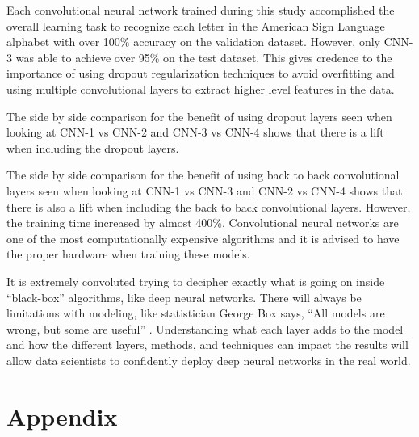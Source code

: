 \documentclass[5p,authoryear]{elsarticle}
\begin{document}
Each convolutional neural network trained during this study accomplished the overall learning task to recognize each letter in the American Sign Language alphabet with over 100\% accuracy on the validation dataset. However, only CNN-3 was able to achieve over 95\% on the test dataset. This gives credence to the importance of using dropout regularization techniques to avoid overfitting and using multiple convolutional layers to extract higher level features in the data.

The side by side comparison for the benefit of using dropout layers seen when looking at CNN-1 vs CNN-2 and CNN-3 vs CNN-4 shows that there is a lift when including the dropout layers. 

The side by side comparison for the benefit of using back to back convolutional layers seen when looking at CNN-1 vs CNN-3 and CNN-2 vs CNN-4 shows that there is also a lift when including the back to back convolutional layers. However, the training time increased by almost 400\%. Convolutional neural networks are one of the most computationally expensive algorithms and it is advised to have the proper hardware when training these models.

It is extremely convoluted trying to decipher exactly what is going on inside “black-box” algorithms, like deep neural networks. There will always be limitations with modeling, like statistician George Box says, “All models are wrong, but some are useful” \citep{box}. Understanding what each layer adds to the model and how the different layers, methods, and techniques can impact the results will allow data scientists to confidently deploy deep neural networks in the real world. 



\section*{Appendix}





\end{document}
